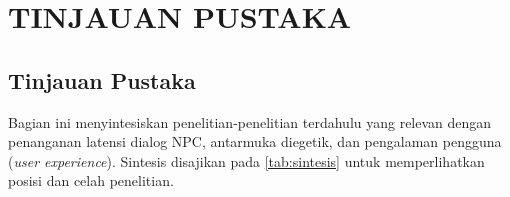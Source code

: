 
\chapter{TINJAUAN PUSTAKA}

\section{Tinjauan Pustaka}

%

Bagian ini menyintesiskan penelitian-penelitian terdahulu yang relevan dengan penanganan latensi dialog NPC, antarmuka diegetik, dan pengalaman pengguna (\textit{user experience}). Sintesis disajikan pada \cref{tab:sintesis} untuk memperlihatkan posisi dan celah penelitian.


